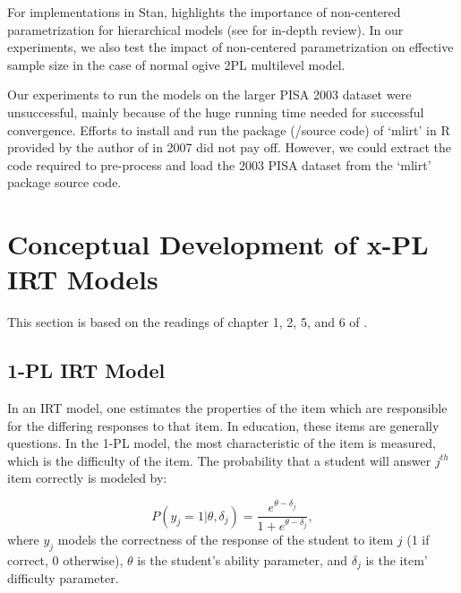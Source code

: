 \documentclass[12pt]{article}
\begin{document}
For implementations in Stan, \cite{furr2016two} highlights the importance of non-centered parametrization for hierarchical models (see \cite{papaspiliopoulos2007general} for in-depth review). In our experiments, we also test the impact of non-centered parametrization on effective sample size in the case of normal ogive 2PL multilevel model.

Our experiments to run the models on the larger PISA 2003 dataset were unsuccessful, mainly because of the huge running time needed for successful convergence. Efforts to install and run the package (/source code) of `mlirt' in R provided by the author of \cite{fox2001bayesian} in 2007 \cite{fox2007multilevel} did not pay off. However, we could extract the code required to pre-process and load the 2003 PISA dataset from the `mlirt' package source code.


\section{Conceptual Development of x-PL IRT Models} \label{sec:xpl_irt}

This section is based on the readings of chapter 1, 2, 5, and 6 of \cite{de2013theory}.

\subsection{1-PL IRT Model}
In an IRT model, one estimates the properties of the item which are responsible for the differing responses to that item. In education, these items are generally questions. In the 1-PL model, the most characteristic of the item is measured, which is the difficulty of the item. The probability that a student will answer $j^{th}$ item correctly is modeled by:

\begin{equation}\label{eq:1pl}
    P(y_j=1|\theta, \delta_j) = \frac{e^{\theta - \delta_j}}{1+e^{\theta - \delta_j}},
\end{equation}
where $y_j$ models the correctness of the response of the student to item $j$ (1 if correct, 0 otherwise),  $\theta$ is the student's ability parameter, and $\delta_j$ is the item' difficulty parameter.
\end{document}
